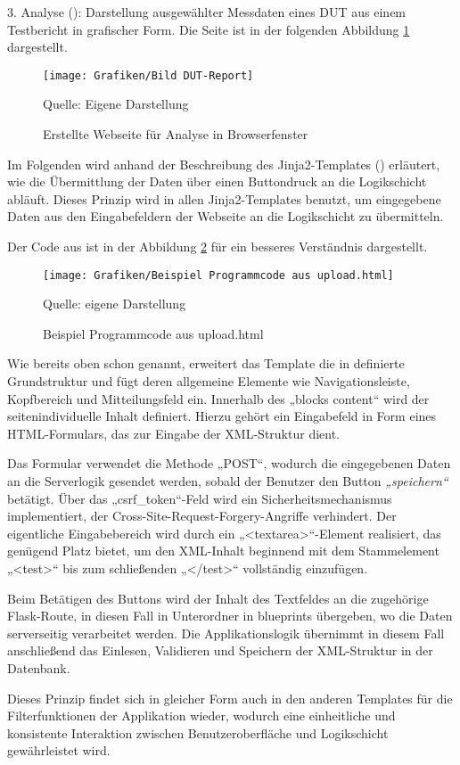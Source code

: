 3. Analyse (): Darstellung ausgewählter Messdaten eines DUT aus einem Testbericht in grafischer Form.
Die Seite ist in der folgenden Abbildung \ref{fig: Webseite für Analyse} dargestellt.

\begin{figure}[H]
    \centering
    \texttt{[image: Grafiken/Bild DUT-Report]}
    \caption{Erstellte Webseite für Analyse in Browserfenster}
    \label{fig: Webseite für Analyse}
    {Quelle: Eigene Darstellung}
\end{figure}


Im Folgenden wird anhand der Beschreibung des
Jinja2-Templates () erläutert, wie die Übermittlung der Daten
über einen Buttondruck an die Logikschicht abläuft. Dieses Prinzip wird in
allen Jinja2-Templates benutzt, um eingegebene Daten aus den Eingabefeldern der
Webseite an die Logikschicht zu übermitteln.


Der Code aus  ist in der Abbildung \ref{fig: Programmcode aus upload.html} für ein besseres Verständnis dargestellt.

\begin{figure}[H]
    \centering
    \texttt{[image: Grafiken/Beispiel Programmcode aus upload.html]}
    \caption{Beispiel Programmcode aus upload.html}
    \label{fig: Programmcode aus upload.html}
    {Quelle: eigene Darstellung}
\end{figure}

Wie bereits oben schon genannt, erweitert das Template die
in  definierte Grundstruktur und fügt deren allgemeine Elemente
wie Navigationsleiste, Kopfbereich und Mitteilungsfeld ein. Innerhalb des „blocks
content“ wird der seitenindividuelle Inhalt definiert. Hierzu gehört ein
Eingabefeld in Form eines HTML-Formulars, das zur Eingabe der XML-Struktur
dient.

Das Formular verwendet die Methode „POST“, wodurch die
eingegebenen Daten an die Serverlogik gesendet werden, sobald der Benutzer den
Button \textit{„speichern“} betätigt. Über das „csrf\_token“-Feld wird ein
Sicherheitsmechanismus implementiert, der Cross-Site-Request-Forgery-Angriffe
verhindert. Der eigentliche Eingabebereich wird durch ein „<textarea>“-Element
realisiert, das genügend Platz bietet, um den XML-Inhalt beginnend mit dem
Stammelement „<test>“ bis zum schließenden „</test>“ vollständig
einzufügen.

Beim Betätigen des Buttons wird der Inhalt des Textfeldes an
die zugehörige Flask-Route, in diesen Fall  in Unterordner 
in blueprints übergeben, wo die Daten serverseitig verarbeitet werden.
Die Applikationslogik übernimmt in diesem Fall anschließend das Einlesen, Validieren und Speichern
der XML-Struktur in der Datenbank.

Dieses Prinzip findet sich in gleicher Form auch in den
anderen Templates für die Filterfunktionen der Applikation wieder, wodurch eine einheitliche und
konsistente Interaktion zwischen Benutzeroberfläche und Logikschicht
gewährleistet wird.









